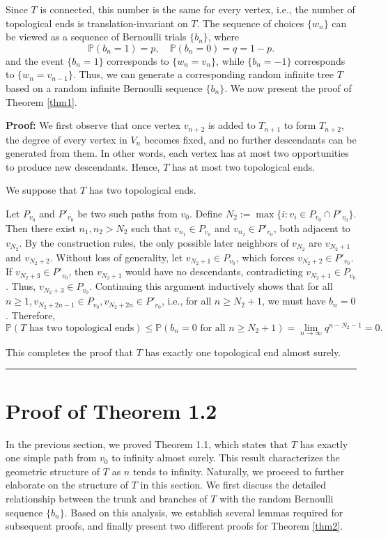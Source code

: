 \documentclass[10pt,twoside]{article}
\renewenvironment{proof}[1]{\noindent\textbf{#1}}{\ \rule{0.5em}{0.5em}}
\begin{document}
Since $T$ is connected, this number is the same for every vertex, i.e., the number of topological ends is translation-invariant on $T$.  The sequence of choices $ \{w_n\} $ can be viewed as a sequence of Bernoulli trials $ \{b_n\} $, where
$$
  \mathbb{P}(b_n = 1) = p, \quad \mathbb{P}(b_n = 0) = q = 1-p.
$$
and the event $ \{b_n = 1\}$ corresponds to $\{w_n = v_n\}$, while $\{b_n = -1\}$ corresponds to $\{w_n = v_{n-1}\}$. Thus, we can generate a corresponding random infinite tree $ T $ based on a random infinite Bernoulli sequence $ \{b_n\} $. We now present the proof of Theorem \ref{thm1}.

\begin{proof}
P\textbf{roof: }\label{pofthm1}We first observe that once vertex $ v_{n+2} $ is added to $ T_{n+1} $ to form $ T_{n+2} $, the degree of every vertex in $ V_n $ becomes fixed, and no further descendants can be generated from them. In other words, each vertex has at most two opportunities to produce new descendants. Hence, $T$ has at most two topological ends.

We suppose that $T$ has two topological ends. 

Let $ P_{v_0} $ and $ P'_{v_0} $ be two such paths from $ v_0 $. Define $ N_2 := \max\{i : v_i \in P_{v_0} \cap P'_{v_0}\} $. Then there exist $ n_1, n_2 > N_2 $ such that $ v_{n_1} \in P_{v_0} $ and $ v_{n_2} \in P'_{v_0} $, both adjacent to $ v_{N_2} $. By the construction rules, the only possible later neighbors of $ v_{N_2} $ are $ v_{N_2+1} $ and $ v_{N_2+2} $. Without loss of generality, let $ v_{N_2+1} \in P_{v_0} $, which forces $ v_{N_2+2} \in P'_{v_0} $. If $ v_{N_2+3} \in P'_{v_0} $, then $ v_{N_2+1} $ would have no descendants, contradicting $ v_{N_2+1} \in P_{v_0} $. Thus, $ v_{N_2+3} \in P_{v_0} $. Continuing this argument inductively shows that for all $ n\ge 1, v_{N_2+2n-1}\in P_{v_0},v_{N_2+2n}\in P'_{v_0}$, i.e., for all $ n \ge N_2+1 $, we must have $ b_n = 0$. Therefore,
$$
\mathbb{P}(T \text{ has two topological ends}) \le \mathbb{P}(b_n = 0 \text{ for all } n \ge N_2+1) = \lim_{n \to \infty} q^{n-N_2-1} = 0.
$$

This completes the proof that $T$ has exactly one topological end almost surely.
\end{proof}

\section{Proof of Theorem 1.2}\label{sec3}

In the previous section, we proved Theorem 1.1, which states that $T$ has exactly one simple path from $v_0$ to infinity almost surely. This result characterizes the geometric structure of $T$ as $n$ tends to infinity. Naturally, we proceed to further elaborate on the structure of $T$ in this section. We first discuss the detailed relationship between the trunk and branches of $T$ with the random Bernoulli sequence $\{b_n\}$. Based on this analysis, we establish several lemmas required for subsequent proofs, and finally present two different proofs for Theorem \ref{thm2}.
\end{document}
